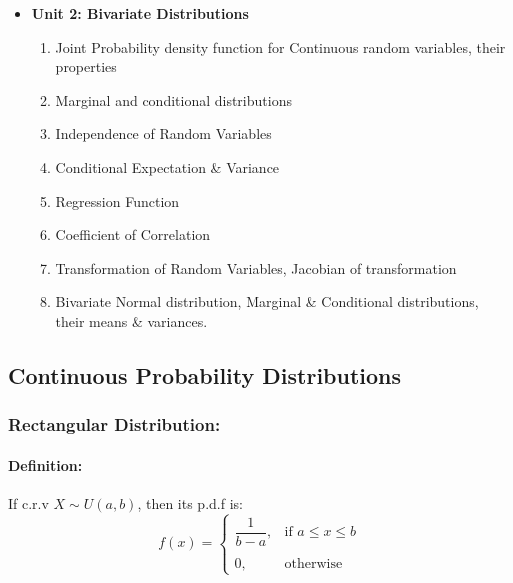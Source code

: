 \documentclass[
10pt, %
a4paper, %
]{report}
\begin{document}
\begin{itemize}
\begin{enumerate}
\end{enumerate}
\item[] \textbf{Unit 2: Bivariate Distributions}
\begin{enumerate}
\item Joint Probability density function for Continuous random variables, their properties
\item Marginal and conditional distributions
\item Independence of Random Variables
\item Conditional Expectation \& Variance
\item Regression Function
\item Coefficient of Correlation
\item Transformation of Random Variables, Jacobian of transformation
\item Bivariate Normal distribution, Marginal \& Conditional distributions, their means \& variances.
\end{enumerate}
\end{itemize}

\subsection*{Continuous Probability Distributions}
\subsubsection*{Rectangular Distribution:}
\paragraph*{Definition:}
If c.r.v \(X\sim U(a, b)\), then its p.d.f is:
\[
    f(x)= 
\begin{cases}
    \dfrac{1}{b-a},        & \text{if } a\leq x \leq b\\ \\
    0,                    & \text{otherwise}
\end{cases}
\]
\end{document}
